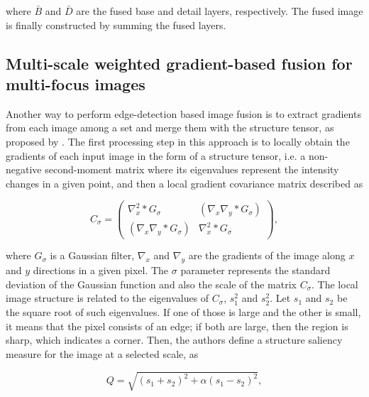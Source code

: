 \noindent where $\bar{B}$ and $\bar{D}$ are the fused base and detail layers, respectively. The fused image is finally constructed by summing the fused layers.

\subsection{Multi-scale weighted gradient-based fusion for multi-focus images}

Another way to perform edge-detection based image fusion is to extract gradients from each image among a set and merge them with the structure tensor, as proposed by . The first processing step in this approach is to locally obtain the gradients of each input image in the form of a structure tensor, i.e. a non-negative second-moment matrix where its eigenvalues represent the intensity changes in a given point, and then a local gradient covariance matrix described as

\begin{equation}
C_{\sigma} =
    \begin{pmatrix}
        \nabla_{x}^{2} \ast G_{\sigma}
        &
        \left(
            \nabla_{x}\nabla_{y} \ast G_{\sigma}
        \right)
        \\
        \left(
            \nabla_{x}\nabla_{y} \ast G_{\sigma}
        \right)
        &
        \nabla_{x}^{2} \ast G_{\sigma}
    \end{pmatrix},
\end{equation}

\noindent where $G_{\sigma}$ is a Gaussian filter, $\nabla_{x}$ and $\nabla_{y}$ are the gradients of the image along $x$ and $y$ directions in a given pixel. The $\sigma$ parameter represents the standard deviation of the Gaussian function and also the scale of the matrix $C_{\sigma}$. The local image structure is related to the eigenvalues of $C_{\sigma}$, $s_{1}^{2}$ and $s_{2}^{2}$. Let $s_{1}$ and $s_{2}$ be the square root of such eigenvalues. If one of those is large and the other is small, it means that the pixel consists of an edge; if both are large, then the region is sharp, which indicates a corner. Then, the authors define a structure saliency measure for the image at a selected scale, as

\begin{equation}
\label{eqn:structure_saliency}
Q = \sqrt{(s_{1} + s_{2})^{2} + \alpha(s_{1} - s_{2})^{2}},
\end{equation}

